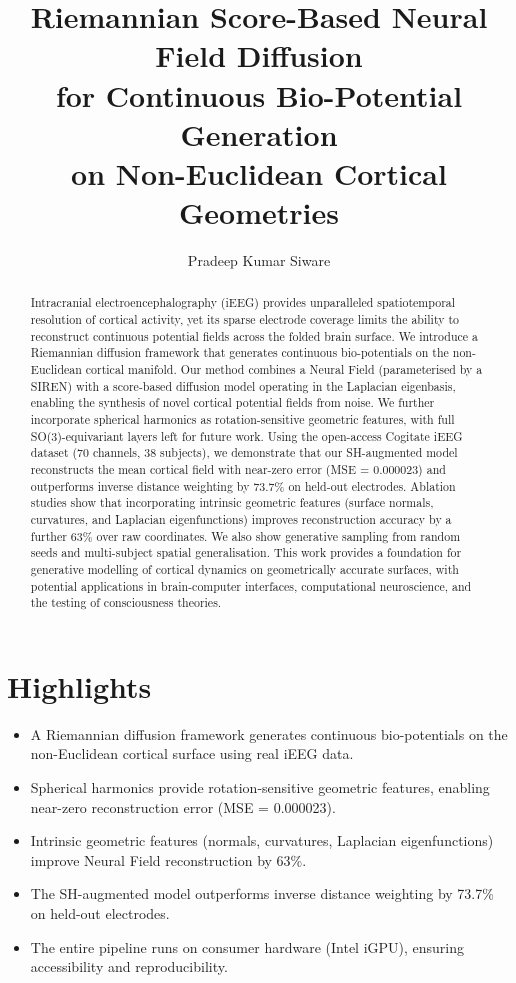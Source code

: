\documentclass[twocolumn]{article}
\title{Riemannian Score-Based Neural Field Diffusion \\ for Continuous Bio-Potential Generation \\ on Non-Euclidean Cortical Geometries}
\author{Pradeep Kumar Siware}
\date{}
\begin{document}
	
	\maketitle
	
	\begin{abstract}
		Intracranial electroencephalography (iEEG) provides unparalleled spatiotemporal resolution of cortical activity, yet its sparse electrode coverage limits the ability to reconstruct continuous potential fields across the folded brain surface. We introduce a Riemannian diffusion framework that generates continuous bio-potentials on the non-Euclidean cortical manifold. Our method combines a Neural Field (parameterised by a SIREN) with a score-based diffusion model operating in the Laplacian eigenbasis, enabling the synthesis of novel cortical potential fields from noise. We further incorporate spherical harmonics as rotation-sensitive geometric features, with full SO(3)-equivariant layers left for future work. Using the open-access Cogitate iEEG dataset (70 channels, 38 subjects), we demonstrate that our SH-augmented model reconstructs the mean cortical field with near-zero error (MSE = 0.000023) and outperforms inverse distance weighting by 73.7\% on held-out electrodes. Ablation studies show that incorporating intrinsic geometric features (surface normals, curvatures, and Laplacian eigenfunctions) improves reconstruction accuracy by a further 63\% over raw coordinates. We also show generative sampling from random seeds and multi-subject spatial generalisation. This work provides a foundation for generative modelling of cortical dynamics on geometrically accurate surfaces, with potential applications in brain-computer interfaces, computational neuroscience, and the testing of consciousness theories.
	\end{abstract}
	
	\section*{Highlights}
	\begin{itemize}
		\item A Riemannian diffusion framework generates continuous bio-potentials on the non-Euclidean cortical surface using real iEEG data.
		\item Spherical harmonics provide rotation-sensitive geometric features, enabling near-zero reconstruction error (MSE = 0.000023).
		\item Intrinsic geometric features (normals, curvatures, Laplacian eigenfunctions) improve Neural Field reconstruction by 63\%.
		\item The SH-augmented model outperforms inverse distance weighting by 73.7\% on held-out electrodes.
		\item The entire pipeline runs on consumer hardware (Intel iGPU), ensuring accessibility and reproducibility.
	\end{itemize}
	
\end{document}
